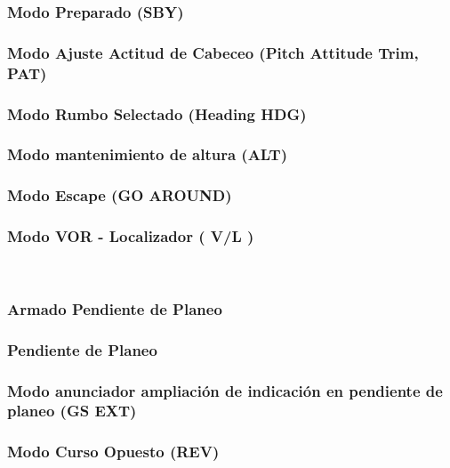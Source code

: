 \documentclass[a4paper,12pt,twoside]{article}
\begin{document}
\subsubsection{Modo Preparado (SBY)}
\label{sec:modo.sby}

\subsubsection{Modo Ajuste Actitud de Cabeceo (Pitch Attitude Trim, PAT)}
\label{sec:modo.ajuste.pitch}

\subsubsection{Modo Rumbo Selectado (Heading HDG)}
\label{sec:hdg}

\subsubsection{Modo mantenimiento de altura (ALT)}
\label{sec:alt}

\subsubsection{Modo Escape (GO AROUND)}
\label{sec:go.araund}

\subsubsection{Modo VOR - Localizador (	V/L )} \\
\label{sec:VL}

\subsubsection{Armado Pendiente de Planeo}
\label{sec:GS.arm}

\subsubsection{Pendiente de Planeo}
\label{sec:gs}

\subsubsection{Modo anunciador ampliaci\'on de indicaci\'on en pendiente de planeo (GS EXT)}
\label{sec:gs.ext}

\subsubsection{Modo Curso Opuesto (REV)}
\label{sec:rev}
\end{document}
